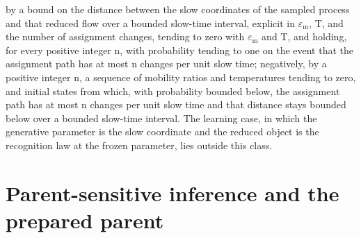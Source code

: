 by a bound on the distance between the slow coordinates of the sampled process and
that reduced flow over a bounded slow-time interval, explicit in
$\varepsilon_{\mathrm m}$, $\mathrm T$, and the number of assignment changes, tending
to zero with $\varepsilon_{\mathrm m}$ and $\mathrm T$, and holding, for every
positive integer $\mathrm n$, with probability tending to one on the event that the
assignment path has at most $\mathrm n$ changes per unit slow time; negatively, by
a positive integer $\mathrm n$, a sequence of mobility ratios and temperatures
tending to zero, and initial states from which, with probability bounded below, the
assignment path has at most $\mathrm n$ changes per unit slow time and that
distance stays bounded below over a bounded slow-time interval. The
learning case, in which the generative parameter is the slow coordinate and the
reduced object is the recognition law at the frozen parameter, lies outside this
class.

\section{Parent-sensitive inference and the prepared parent}
\label{sec:rg-memory-parent-mechanism}

